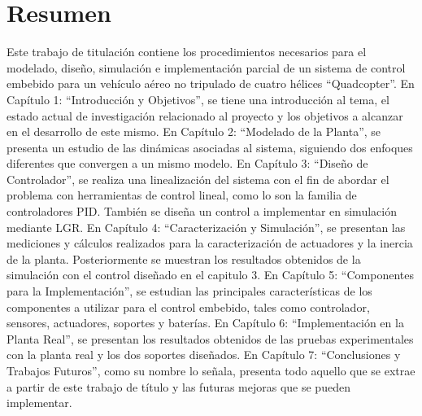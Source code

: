 \documentclass[\main/main.tex]{subfiles}
\begin{document}
\chapter{Resumen}
Este trabajo de titulación contiene los procedimientos necesarios para el modelado, diseño, simulación e implementación parcial de un sistema de control embebido para un vehículo aéreo no tripulado de cuatro hélices “Quadcopter”.
\hfill \break
En Capítulo 1: “Introducción y Objetivos”, se tiene una introducción al tema, el estado actual de investigación relacionado al proyecto y los objetivos a alcanzar en el desarrollo de este mismo.
\hfill \break
En Capítulo 2: “Modelado de la Planta”, se presenta un estudio de las dinámicas asociadas al sistema, siguiendo dos enfoques diferentes que convergen a un mismo modelo. 
\hfill \break
En Capítulo 3: “Diseño de Controlador”, se realiza una linealización del sistema con el fin de abordar el problema con herramientas de control lineal, como lo son la familia de controladores PID. También se diseña un control a implementar en simulación mediante LGR.
\hfill \break
En Capítulo 4: “Caracterización y Simulación”, se presentan las mediciones y cálculos realizados para la caracterización de actuadores y la inercia de la planta. Posteriormente se muestran los resultados obtenidos de la simulación con el control diseñado en el capitulo 3.
\hfill \break
En Capítulo 5: “Componentes para la Implementación”, se estudian las principales características de los componentes a utilizar para el control embebido, tales como controlador, sensores, actuadores, soportes y baterías.
\hfill \break
En Capítulo 6: “Implementación en la Planta Real”, se presentan los resultados obtenidos de las pruebas experimentales con la planta real y los dos soportes diseñados. 
\hfill \break
En Capítulo 7: “Conclusiones y Trabajos Futuros”, como su nombre lo señala, presenta todo aquello que se extrae a partir de este trabajo de título y las futuras mejoras que se pueden implementar.
\newpage
	
\end{document}
